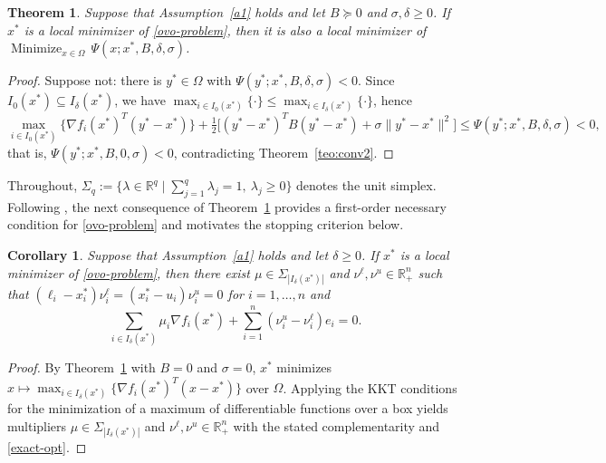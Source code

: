 \documentclass[11pt]{article}
\newcommand{\minimize}{\mathop{\text{Minimize}}}
\newtheorem{theorem}{Theorem}[section]
\newtheorem{corollary}{Corollary}[section]
\begin{document}
\begin{theorem} \label{teo:conv3}
Suppose that Assumption~\ref{a1} holds and let $B \succeq 0$ and
$\sigma, \delta \geq 0$. If $x^*$ is a local minimizer of \eqref{ovo-problem},
then it is also a local minimizer of
$\minimize_{x \in \Omega}\, \Psi(x; x^*, B, \delta, \sigma)$.
\end{theorem}

\begin{proof}
Suppose not: there is $y^* \in \Omega$ with
$\Psi(y^*; x^*, B, \delta, \sigma) < 0$. Since
$I_0(x^*) \subseteq I_\delta(x^*)$, we have
$\max_{i \in I_0(x^*)}\{\cdot\} \leq \max_{i \in I_\delta(x^*)}\{\cdot\}$, hence
\[
\max_{i \in I_0(x^*)} \{ \nabla f_i(x^*)^T(y^* - x^*) \}
+ \tfrac{1}{2} \big[ (y^* - x^*)^T B (y^* - x^*) + \sigma \|y^* - x^*\|^2 \big]
\leq \Psi(y^*; x^*, B, \delta, \sigma) < 0,
\]
that is, $\Psi(y^*; x^*, B, 0, \sigma) < 0$, contradicting
Theorem~\ref{teo:conv2}.
\end{proof}

Throughout, $\Sigma_q := \{ \lambda \in \mathbb{R}^q \mid
\sum_{j=1}^q \lambda_j = 1,\ \lambda_j \geq 0 \}$ denotes the unit simplex.
Following \cite{alvarezovo}, the next consequence of Theorem~\ref{teo:conv3}
provides a first-order necessary condition for \eqref{ovo-problem} and
motivates the stopping criterion below.

\begin{corollary} \label{cor:exact}
Suppose that Assumption~\ref{a1} holds and let $\delta \geq 0$. If $x^*$ is a
local minimizer of \eqref{ovo-problem}, then there exist
$\mu \in \Sigma_{|I_\delta(x^*)|}$ and $\nu^\ell, \nu^u \in \mathbb{R}^n_+$ such
that $(\ell_i - x^*_i)\nu^\ell_i = (x^*_i - u_i)\nu^u_i = 0$ for
$i = 1, \ldots, n$ and
\begin{equation} \label{exact-opt}
\sum_{i \in I_\delta(x^*)} \mu_i \nabla f_i(x^*)
+ \sum_{i=1}^n (\nu^u_i - \nu^\ell_i) e_i = 0.
\end{equation}
\end{corollary}

\begin{proof}
By Theorem~\ref{teo:conv3} with $B = 0$ and $\sigma = 0$, $x^*$ minimizes
$x \mapsto \max_{i \in I_\delta(x^*)} \{ \nabla f_i(x^*)^T(x - x^*) \}$ over
$\Omega$. Applying the KKT conditions for the minimization of a maximum of
differentiable functions over a box \cite[Lemma~3.1]{alvarezovo} yields
multipliers $\mu \in \Sigma_{|I_\delta(x^*)|}$ and
$\nu^\ell, \nu^u \in \mathbb{R}^n_+$ with the stated complementarity and
\eqref{exact-opt}.
\end{proof}
\end{document}
